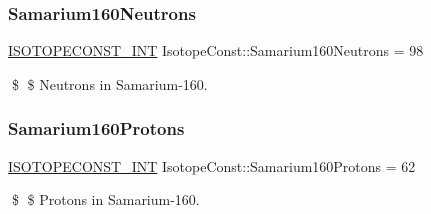 \subsubsection{\texorpdfstring{Samarium160\+Neutrons}{Samarium160Neutrons}}
{\footnotesize\ttfamily \mbox{\hyperlink{group___isotope_const-_macros_ga5f18360b3e99483a35c32d789e62621c}{I\+S\+O\+T\+O\+P\+E\+C\+O\+N\+S\+T\+\_\+\+I\+NT}} Isotope\+Const\+::\+Samarium160\+Neutrons = 98}

\$ \$ Neutrons in Samarium-\/160. \mbox{\label{group___isotope_const-_samarium-_sm160_ga953046c9139b5140259835b1c81399ae}} 
\subsubsection{\texorpdfstring{Samarium160\+Protons}{Samarium160Protons}}
{\footnotesize\ttfamily \mbox{\hyperlink{group___isotope_const-_macros_ga5f18360b3e99483a35c32d789e62621c}{I\+S\+O\+T\+O\+P\+E\+C\+O\+N\+S\+T\+\_\+\+I\+NT}} Isotope\+Const\+::\+Samarium160\+Protons = 62}

\$ \$ Protons in Samarium-\/160. 